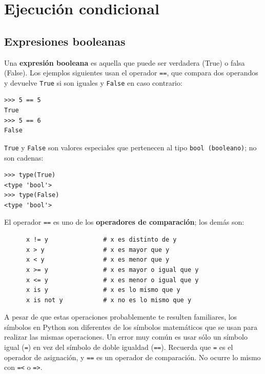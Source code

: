 
\chapter{Ejecución condicional}

\section{Expresiones booleanas}

Una {\bf expresión booleana} es aquella que puede ser verdadera (True)
o falsa (False). Los ejemplos siguientes usan el operador
{\tt ==}, que compara dos operandos y devuelve
{\tt True} si son iguales y {\tt False} en caso contrario:

\beforeverb
\begin{verbatim}
>>> 5 == 5
True
>>> 5 == 6
False
\end{verbatim}
\afterverb
%
{\tt True} y {\tt False} son valores especiales
que pertenecen al tipo {\tt bool (booleano)}; no son cadenas:


\beforeverb
\begin{verbatim}
>>> type(True)
<type 'bool'>
>>> type(False)
<type 'bool'>
\end{verbatim}
\afterverb
%
El operador {\tt ==} es uno de los {\bf operadores de comparación};
los demás son:

\beforeverb
\begin{verbatim}
      x != y               # x es distinto de y
      x > y                # x es mayor que y
      x < y                # x es menor que y
      x >= y               # x es mayor o igual que y
      x <= y               # x es menor o igual que y
      x is y               # x es lo mismo que y
      x is not y           # x no es lo mismo que y
\end{verbatim}
\afterverb
%
A pesar de que estas operaciones probablemente te resulten familiares, los
símbolos en Python son diferentes de los símbolos matemáticos que se usan
para realizar las mismas operaciones. Un error muy común
es usar sólo un símbolo igual ({\tt =}) en vez del símbolo de doble igualdad
({\tt ==}). Recuerda que {\tt =} es el operador de asignación, y
{\tt ==} es un operador de comparación. No ocurre lo mismo con
{\tt \verb"=<"} o {\tt \verb"=>"}.


